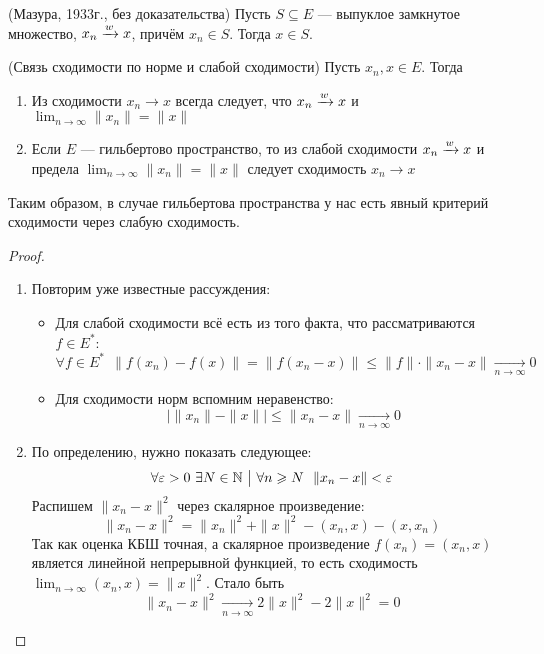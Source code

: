 \begin{theorem} (Мазура, 1933г., без доказательства)
	Пусть $S \subseteq E$ --- выпуклое замкнутое множество, $x_n \xrightarrow{w} x$, причём $x_n \in S$. Тогда $x \in S$.
\end{theorem}

\begin{proposition} (Связь сходимости по норме и слабой сходимости)
	Пусть $x_n, x \in E$. Тогда
	\begin{enumerate}
		\item Из сходимости $x_n \to x$ всегда следует, что $x_n \xrightarrow{w} x$ и $\lim_{n \to \infty} \|x_n\| = \|x\|$
		
		\item Если $E$ --- гильбертово пространство, то из слабой сходимости $x_n \xrightarrow{w} x$ и предела $\lim_{n \to \infty} \|x_n\| = \|x\|$ следует сходимость $x_n \to x$
	\end{enumerate}
\end{proposition}

\begin{anote}
	Таким образом, в случае гильбертова пространства у нас есть явный критерий сходимости через слабую сходимость.
\end{anote}

\begin{proof}~
	\begin{enumerate}
		\item Повторим уже известные рассуждения:
		\begin{itemize}
			\item Для слабой сходимости всё есть из того факта, что рассматриваются $f \in E^*$:
			\[
				\forall f \in E^*\ \ \|f(x_n) - f(x)\| = \|f(x_n - x)\| \le \|f\| \cdot \|x_n - x\| \xrightarrow[n \to \infty]{} 0
			\]
			
			\item Для сходимости норм вспомним неравенство:
			\[
				\big|\|x_n\| - \|x\|\big| \le \|x_n - x\| \xrightarrow[n \to \infty]{} 0
			\]
		\end{itemize}
		
		\item По определению, нужно показать следующее:
		\[
			\forall \varepsilon > 0\ \exists N \in \mathbb{N} \ \big|\  \forall n \geqslant N\ \ \|x_n - x\| < \varepsilon
		\]
		Распишем $\|x_n - x\|^2$ через скалярное произведение:
		\[
			\|x_n - x\|^2 = \|x_n\|^2 + \|x\|^2 - (x_n, x) - (x, x_n)
		\]
		Так как оценка КБШ точная, а скалярное произведение $f(x_n) = (x_n, x)$ является линейной непрерывной функцией, то есть сходимость $\lim_{n \to \infty} (x_n, x) = \|x\|^2$. Стало быть
		\[
			\|x_n - x\|^2 \xrightarrow[n \to \infty]{} 2\|x\|^2 - 2\|x\|^2 = 0
		\]
	\end{enumerate}
\end{proof}

